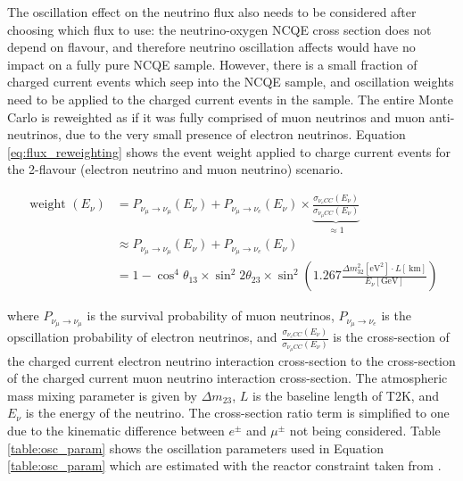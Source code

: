  
 The oscillation effect on the neutrino flux also needs to be considered after choosing which flux to use: the neutrino-oxygen NCQE cross section does not depend on flavour, and therefore neutrino oscillation affects would have no impact on a fully pure NCQE sample. However, there is a small fraction of charged current events which seep into the NCQE sample, and oscillation weights need to be applied to the charged current events in the sample. The entire Monte Carlo is reweighted as if it was fully comprised of muon neutrinos and muon anti-neutrinos, due to the very small presence of electron neutrinos. Equation \ref{eq:flux_reweighting} shows the event weight applied to charge current events for the 2-flavour (electron neutrino and muon neutrino) scenario.

 \begin{equation}
 \begin{aligned}
 \text { weight }\left(E_\nu\right) & =P_{\nu_\mu \rightarrow \nu_\mu}\left(E_\nu\right)+P_{\nu_\mu \rightarrow \nu_e}\left(E_\nu\right) \times \underbrace{\frac{\sigma_{\nu_e C C}\left(E_\nu\right)}{\sigma_{\nu_\mu C C}\left(E_\nu\right)}}_{\approx 1} \\
 & \approx P_{\nu_\mu \rightarrow \nu_\mu}\left(E_\nu\right)+P_{\nu_\mu \rightarrow \nu_e}\left(E_\nu\right) \\
 & =1-\cos ^4 \theta_{13} \times \sin ^2 2 \theta_{23} \times \sin ^2\left(1.267 \frac{\Delta m_{32}^2\left[\mathrm{eV}^2\right] \cdot L[\mathrm{~km}]}{E_\nu[\mathrm{GeV}]}\right)
 \label{eq:flux_reweighting}
 \end{aligned}
\end{equation}

where $P_{\nu_\mu \rightarrow \nu_\mu}$ is the survival probability of muon neutrinos, $P_{\nu_\mu \rightarrow \nu_e}$ is the opscillation probability of electron neutrinos, and $\frac{\sigma_{\nu_e C C}\left(E_\nu\right)}{\sigma_{\nu_\mu C C}\left(E_\nu\right)}$ is the cross-section of the charged current electron neutrino interaction cross-section to the cross-section of the charged current muon neutrino interaction cross-section. The atmospheric mass mixing parameter is given by $\Delta m_{23}$, $L$ is the baseline length of T2K, and $E_{\nu}$ is the energy of the neutrino. The cross-section ratio term is simplified to one due to the kinematic difference between $e^{\pm}$ and $\mu^{\pm}$ not being considered. Table \ref{table:osc_param} shows the oscillation parameters used in Equation \ref{table:osc_param} which are estimated with the reactor constraint taken from \cite{tn_osc_param}.

